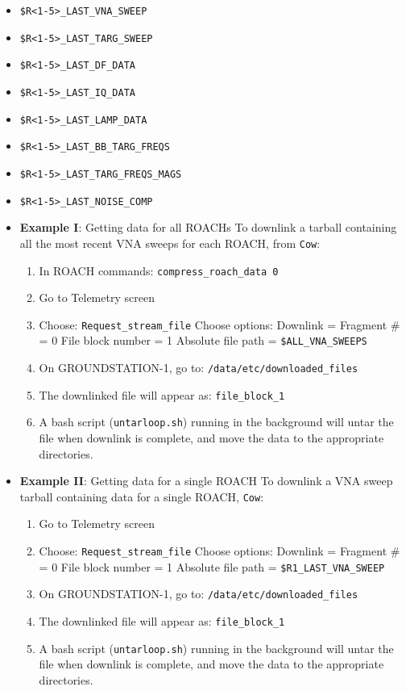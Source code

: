 \begin{itemize}[leftmargin=*,label={}]

\item \texttt{\$R<1-5>\_LAST\_VNA\_SWEEP}
\item \texttt{\$R<1-5>\_LAST\_TARG\_SWEEP}
\item \texttt{\$R<1-5>\_LAST\_DF\_DATA}
\item \texttt{\$R<1-5>\_LAST\_IQ\_DATA}
\item \texttt{\$R<1-5>\_LAST\_LAMP\_DATA}
\item \texttt{\$R<1-5>\_LAST\_BB\_TARG\_FREQS}
\item \texttt{\$R<1-5>\_LAST\_TARG\_FREQS\_MAGS}
\item \texttt{\$R<1-5>\_LAST\_NOISE\_COMP}

\item \textbf{Example I}: Getting data for all ROACHs
To downlink a tarball containing all the most recent VNA sweeps for each ROACH, from \texttt{Cow}:
\begin{enumerate}
  \item In ROACH commands: \texttt{compress\_roach\_data 0}
  \item Go to Telemetry screen
  \item Choose: \texttt{Request\_stream\_file}
    Choose options:
    Downlink =
    Fragment \# = 0
    File block number = 1
    Absolute file path = \texttt{\$ALL\_VNA\_SWEEPS}
  \item On GROUNDSTATION-1, go to: \texttt{/data/etc/downloaded\_files}
  \item The downlinked file will appear as: \texttt{file\_block\_1}
  \item A bash script (\texttt{untarloop.sh}) running in the background will untar the file when downlink is complete, and move the data to the appropriate directories.
\end{enumerate}

\item \textbf{Example II}: Getting data for a single ROACH
To downlink a VNA sweep tarball containing data for a single ROACH, \texttt{Cow}:
\begin{enumerate}
  \item Go to Telemetry screen
  \item Choose: \texttt{Request\_stream\_file}
    Choose options:
    Downlink =
    Fragment \# = 0
    File block number = 1
    Absolute file path = \texttt{\$R1\_LAST\_VNA\_SWEEP}
  \item On GROUNDSTATION-1, go to: \texttt{/data/etc/downloaded\_files}
  \item The downlinked file will appear as: \texttt{file\_block\_1}
  \item A bash script (\texttt{untarloop.sh}) running in the background will untar the file when downlink is complete, and move the data to the appropriate directories.
\end{enumerate}

\end{itemize}
